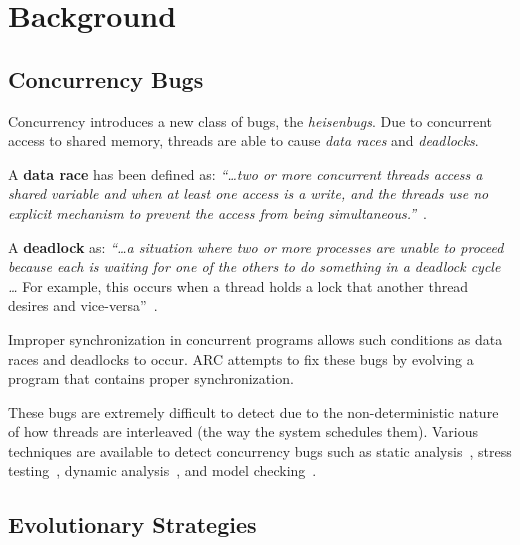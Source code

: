 \section{Background}
\label{sec:background}

\subsection{Concurrency Bugs}
\label{sec:concurrency}


Concurrency introduces a new class of bugs, the \textit{heisenbugs}. Due to
concurrent access to shared memory, threads are able to cause \textit{data
races} and \textit{deadlocks}.

A \textbf{data race} has been defined as: \textit{``\ldots two or more
concurrent threads access a shared variable and when at least one access is a
write, and the threads use no explicit mechanism to prevent the access from
being simultaneous.''}~\cite{LSW07}.

A \textbf{deadlock} as: \textit{``\ldots a situation where two or more
processes are unable to proceed because each is waiting for one of the others
to do something in a deadlock cycle \ldots} For example, this occurs when a
thread holds a lock that another thread desires and vice-versa''~\cite{LSW07}.

Improper synchronization in concurrent programs allows such conditions as data
races and deadlocks to occur. ARC attempts to fix these bugs by evolving a
program that contains proper synchronization.

These bugs are extremely difficult to detect due to the non-deterministic
nature of how threads are interleaved (the way the system schedules them).
Various techniques are available to detect concurrency bugs such as static
analysis~\cite{NA07,NPSG09,HP04}, stress testing~\cite{HSU03}, dynamic
analysis~\cite{JNPS09,EFN+02}, and model
checking~\cite{BHPV00,RDH03,OM03,MQB07,Holz97,JM04,HP00}.

\subsection{Evolutionary Strategies}
\label{sec:evolutionary_strategies}

